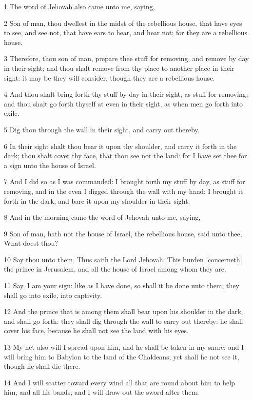 \par 1 The word of Jehovah also came unto me, saying,
\par 2 Son of man, thou dwellest in the midst of the rebellious house, that have eyes to see, and see not, that have ears to hear, and hear not; for they are a rebellious house.
\par 3 Therefore, thou son of man, prepare thee stuff for removing, and remove by day in their sight; and thou shalt remove from thy place to another place in their sight: it may be they will consider, though they are a rebellious house.
\par 4 And thou shalt bring forth thy stuff by day in their sight, as stuff for removing; and thou shalt go forth thyself at even in their sight, as when men go forth into exile.
\par 5 Dig thou through the wall in their sight, and carry out thereby.
\par 6 In their sight shalt thou bear it upon thy shoulder, and carry it forth in the dark; thou shalt cover thy face, that thou see not the land: for I have set thee for a sign unto the house of Israel.
\par 7 And I did so as I was commanded: I brought forth my stuff by day, as stuff for removing, and in the even I digged through the wall with my hand; I brought it forth in the dark, and bare it upon my shoulder in their sight.
\par 8 And in the morning came the word of Jehovah unto me, saying,
\par 9 Son of man, hath not the house of Israel, the rebellious house, said unto thee, What doest thou?
\par 10 Say thou unto them, Thus saith the Lord Jehovah: This burden [concerneth] the prince in Jerusalem, and all the house of Israel among whom they are.
\par 11 Say, I am your sign: like as I have done, so shall it be done unto them; they shall go into exile, into captivity.
\par 12 And the prince that is among them shall bear upon his shoulder in the dark, and shall go forth: they shall dig through the wall to carry out thereby: he shall cover his face, because he shall not see the land with his eyes.
\par 13 My net also will I spread upon him, and he shall be taken in my snare; and I will bring him to Babylon to the land of the Chaldeans; yet shall he not see it, though he shall die there.
\par 14 And I will scatter toward every wind all that are round about him to help him, and all his bands; and I will draw out the sword after them.
